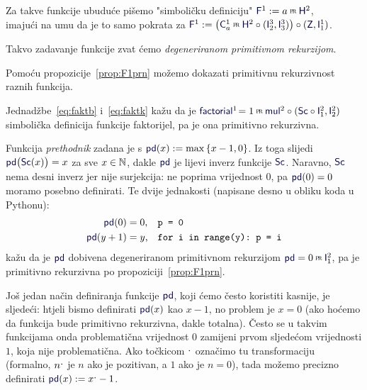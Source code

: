 \begin{definicija}[{name=[degenerirana primitivna rekurzija]}]\label{def:F1prn}
Za takve funkcije ubuduće pišemo "simboličku definiciju" $\f F^1:=a\pr\f H^2$,\\ imajući na umu da je to samo pokrata za $\f F^1:=\bigl(\f C_a^1\pr\f H^2\circ(\f I_2^3,\f I_3^3)\bigr)\circ(\f Z,\f I_1^1)$.

Takvo zadavanje funkcije zvat ćemo \emph{degeneriranom primitivnom rekurzijom}.
\end{definicija}

Pomoću propozicije~\ref{prop:F1prn} možemo dokazati primitivnu rekurzivnost raznih funkcija.%

\begin{primjer}[{name=[primitivna rekurzivnost funkcije faktorijel]}]\label{pr:factorialprn}
Jednadžbe~\eqref{eq:faktb} i~\eqref{eq:faktk} kažu da je $\f{factorial}^1\!=1\pr\f{mul}^2\circ(\f{Sc}\circ\f I_1^2,\f I_2^2)$ simbolička definicija funkcije faktorijel, pa je ona primitivno rekurzivna.
\end{primjer}

\begin{primjer}[{name=[primitivna rekurzivnost funkcije prethodnik]}]
	Funkcija \emph{prethodnik} zadana je s $\f{pd}(x):=\max\,\{x-1,0\}$. Iz toga slijedi $\f{pd}\bigl(\f{Sc}(x)\bigr)=x$ za sve $x\in{\mathbb N}$, dakle $\f{pd}$ je lijevi inverz funkcije $\f{Sc}$. Naravno, $\f{Sc}$ nema desni inverz jer nije surjekcija: ne poprima vrijednost $0$, pa $\f{pd}(0)=0$ moramo posebno definirati. Te dvije jednakosti (napisane desno u obliku koda u Pythonu):
\begin{align}
	\f{pd}(0)&=0\text,&&\texttt{p = 0}\\
	\f{pd}(y+1)&=y\text,&&\texttt{for i in range(y):~p = i}
\end{align}
kažu da je $\f{pd}$ dobivena degeneriranom primitivnom rekurzijom $\f{pd}=0\pr\f I_1^2$, pa je primitivno rekurzivna po propoziciji~\ref{prop:F1prn}.
\end{primjer}

\begin{napomena}[{name=[zamjena nule jedinicom u nekim brojevnim funkcijama]}]\label{nap:crtica}
Još jedan način definiranja funkcije $\f{pd}$, koji ćemo često koristiti kasnije, je sljedeći: htjeli bismo definirati $\f{pd}(x)$ kao $x-1$, no problem je $x=0$ (ako hoćemo da funkcija bude primitivno rekurzivna, dakle totalna). Često se u takvim funkcijama onda problematična vrijednost $0$ zamijeni prvom sljedećom vrijednosti $1$, koja nije problematična. Ako točkicom $\sp{\text{\normalsize.}}$ označimo tu transformaciju (formalno, $n\sp{\text{\normalsize.}}$ je $n$ ako je pozitivan, a $1$ ako je $n=0$), tada možemo precizno definirati $\f{pd}(x):=x\bump-1$.
\end{napomena}

